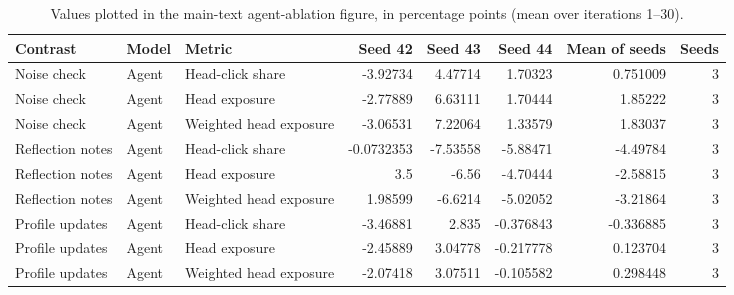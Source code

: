 \begin{table}[htbp!]
\centering
\small
\setlength{\tabcolsep}{3pt}
\renewcommand{\arraystretch}{1.1}
\begin{tabular}{lllrrrrr}
\hline
Contrast & Model & Metric & Seed 42 & Seed 43 & Seed 44 & Mean of seeds & Seeds \\
\hline
Noise check & Agent & Head-click share & -3.92734 & 4.47714 & 1.70323 & 0.751009 & 3 \\
Noise check & Agent & Head exposure & -2.77889 & 6.63111 & 1.70444 & 1.85222 & 3 \\
Noise check & Agent & Weighted head exposure & -3.06531 & 7.22064 & 1.33579 & 1.83037 & 3 \\
Reflection notes & Agent & Head-click share & -0.0732353 & -7.53558 & -5.88471 & -4.49784 & 3 \\
Reflection notes & Agent & Head exposure & 3.5 & -6.56 & -4.70444 & -2.58815 & 3 \\
Reflection notes & Agent & Weighted head exposure & 1.98599 & -6.6214 & -5.02052 & -3.21864 & 3 \\
Profile updates & Agent & Head-click share & -3.46881 & 2.835 & -0.376843 & -0.336885 & 3 \\
Profile updates & Agent & Head exposure & -2.45889 & 3.04778 & -0.217778 & 0.123704 & 3 \\
Profile updates & Agent & Weighted head exposure & -2.07418 & 3.07511 & -0.105582 & 0.298448 & 3 \\
\hline
\end{tabular}
\caption{Values plotted in the main-text agent-ablation figure, in percentage points (mean over iterations 1--30).}
\label{chap:results:tab:main_rq3_ablation_effects_values}
\end{table}
